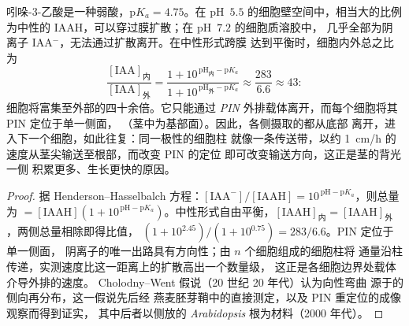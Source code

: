 \begin{theorem}[生长素的化学渗透极性运输]\label{thm:b3:plant-molecular-physiology:auxin}
吲哚-3-乙酸是一种弱酸，$\mathrm{p}K_{a} = 4.75$。在
pH~$5.5$ 的细胞壁空间中，相当大的比例为中性的
IAAH，可以穿过膜扩散；在 pH~$7.2$ 的细胞质溶胶中，
几乎全部为阴离子 IAA$^{-}$，无法通过扩散离开。在中性形式跨膜
达到平衡时，细胞内外总之比
为
\[
\frac{[\text{IAA}]_{\text{内}}}{[\text{IAA}]_{\text{外}}}
= \frac{1 + 10^{\,\mathrm{pH}_{\text{内}} - \mathrm{p}K_{a}}}{1 + 10^{\,\mathrm{pH}_{\text{外}} - \mathrm{p}K_{a}}}
\approx \frac{283}{6.6} \approx 43 :
\]
细胞将富集至外部的四十余倍。它只能通过
\emph{PIN} 外排载体离开，而每个细胞将其 PIN 定位于单一侧面，
（茎中为基部面）。因此，各侧摄取的都从底部
离开，进入下一个细胞，如此往复：同一极性的细胞柱
就像一条传送带，以约
\qty{1}{cm/h} 的速度从茎尖输送至根部，而改变 PIN 的定位
即可改变输送方向，这正是茎的背光一侧
积累更多、生长更快的原因。
\end{theorem}
\begin{proof}
据 Henderson--Hasselbalch 方程：$[\text{IAA}^{-}]/[\text{IAAH}] = 10^{\,\mathrm{pH}
- \mathrm{p}K_{a}}$，则总量为 $= [\text{IAAH}](1 + 10^{\,\mathrm{pH} -
\mathrm{p}K_{a}})$。中性形式自由平衡，$[\text{IAAH}]_{\text{内}}
= [\text{IAAH}]_{\text{外}}$，两侧总量相除即得比值，
$(1 + 10^{2.45})/(1 + 10^{0.75}) = 283/6.6$。PIN 定位于单一侧面，
阴离子的唯一出路具有方向性；由 $n$ 个细胞组成的细胞柱将
通量沿柱传递，实测速度比这一距离上的扩散高出一个数量级，
这正是各细胞边界处载体介导外排的速度。
Cholodny--Went 假说（20 世纪 20 年代）认为向性弯曲
源于的侧向再分布，这一假说先后经
燕麦胚芽鞘中的直接测定，以及 PIN 重定位的成像观察而得到证实，
其中后者以侧放的 \emph{Arabidopsis} 根为材料（2000 年代）。
\end{proof}

